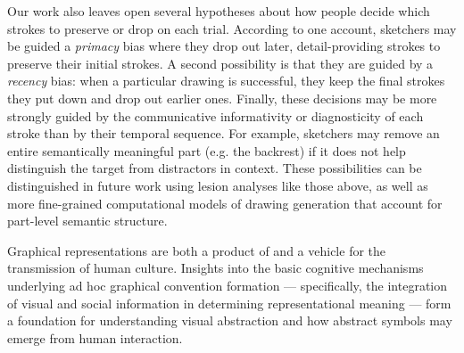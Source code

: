 \documentclass[10pt,letterpaper]{article}
\newcommand{\rdh}[1]{\textcolor{Red}{rdh: #1}}
\begin{document}

Our work also leaves open several hypotheses about how people decide which strokes to preserve or drop on each trial.
According to one account, sketchers may be guided a \emph{primacy} bias where they drop out later, detail-providing strokes to preserve their initial strokes.
A second possibility is that they are guided by a \emph{recency} bias: when a particular drawing is successful, they keep the final strokes they put down and drop out earlier ones.
Finally, these decisions may be more strongly guided by the communicative informativity or diagnosticity of each stroke than by their temporal sequence.
For example, sketchers may remove an entire semantically meaningful part (e.g. the backrest) if it does not help distinguish the target from distractors in context. %
These possibilities can be distinguished in future work using lesion analyses like those above, as well as more fine-grained computational models of drawing generation that account for part-level semantic structure.

Graphical representations are both a product of and a vehicle for the transmission of human culture.
Insights into the basic cognitive mechanisms underlying ad hoc graphical convention formation — specifically, the integration of visual and social information in determining representational meaning — form a foundation for understanding visual abstraction and how abstract symbols may emerge from human interaction.
\end{document}
